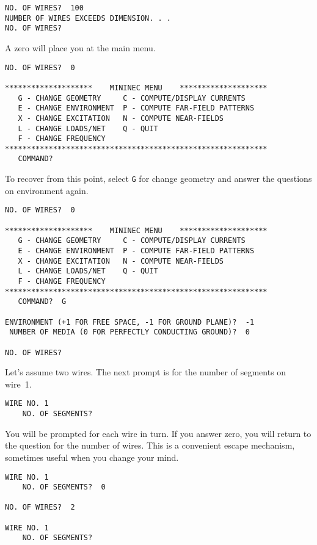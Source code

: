 \documentclass[12pt]{article}
\begin{document}
\begin{Verbatim}
NO. OF WIRES?  100
NUMBER OF WIRES EXCEEDS DIMENSION. . .
NO. OF WIRES?
\end{Verbatim}

\noindent A zero will place you at the main menu.

\begin{Verbatim}
NO. OF WIRES?  0

********************    MININEC MENU    ********************
   G - CHANGE GEOMETRY     C - COMPUTE/DISPLAY CURRENTS
   E - CHANGE ENVIRONMENT  P - COMPUTE FAR-FIELD PATTERNS
   X - CHANGE EXCITATION   N - COMPUTE NEAR-FIELDS
   L - CHANGE LOADS/NET    Q - QUIT
   F - CHANGE FREQUENCY
************************************************************
   COMMAND?
\end{Verbatim}

\noindent To recover from this point, select \verb+G+ for change
geometry and answer the questions on environment again.

\begin{Verbatim}
NO. OF WIRES?  0

********************    MININEC MENU    ********************
   G - CHANGE GEOMETRY     C - COMPUTE/DISPLAY CURRENTS
   E - CHANGE ENVIRONMENT  P - COMPUTE FAR-FIELD PATTERNS
   X - CHANGE EXCITATION   N - COMPUTE NEAR-FIELDS
   L - CHANGE LOADS/NET    Q - QUIT
   F - CHANGE FREQUENCY
************************************************************
   COMMAND?  G

ENVIRONMENT (+1 FOR FREE SPACE, -1 FOR GROUND PLANE)?  -1
 NUMBER OF MEDIA (0 FOR PERFECTLY CONDUCTING GROUND)?  0

NO. OF WIRES?
\end{Verbatim}

Let's assume two wires. The next prompt is for the number of segments on
wire~1.

\begin{Verbatim}
WIRE NO. 1
    NO. OF SEGMENTS?
\end{Verbatim}

You will be prompted for each wire in turn. If you answer zero, you will
return to the question for the number of wires. This is a convenient
escape mechanism, sometimes useful when you change your mind.

\begin{Verbatim}
WIRE NO. 1
    NO. OF SEGMENTS?  0

NO. OF WIRES?  2

WIRE NO. 1
    NO. OF SEGMENTS?
\end{Verbatim}
\end{document}
